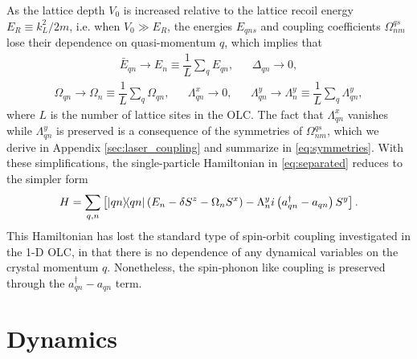 \documentclass[aps,notitlepage,nofootinbib,11pt]{revtex4-1}
\newcommand{\f}[2]{\dfrac{#1}{#2}} %
\newcommand{\p}[1]{\left(#1\right)} %
\renewcommand{\sp}[1]{\left[#1\right]} %
\newcommand{\1}{\mathds{1}}
\begin{document}
As the lattice depth $V_0$ is increased relative to the lattice recoil
energy $E_R\equiv k_L^2/2m$, i.e. when $V_0\gg E_R$, the energies
$E_{qns}$ and coupling coefficients $\Omega^{qs}_{nm}$ lose their
dependence on quasi-momentum $q$, which implies that
\begin{align}
  \bar E_{qn} \to E_n \equiv \f1L\sum_q E_{qn},
  &&
  \Delta_{qn} \to 0,
\end{align}
\begin{align}
  \Omega_{qn} \to \Omega_n \equiv \f1L\sum_q \Omega_{qn},
  &&
  \Lambda_{qn}^x \to 0,
  &&
  \Lambda_{qn}^y \to
  \Lambda_n^y \equiv \f1L\sum_q \Lambda_{qn}^y,
\end{align}
where $L$ is the number of lattice sites in the OLC. The fact that
$\Lambda_{qn}^x$ vanishes while $\Lambda_{qn}^y$ is preserved is a
consequence of the symmetries of $\Omega^{qs}_{nm}$, which we derive
in Appendix \ref{sec:laser_coupling} and summarize in
\eqref{eq:symmetries}. With these simplifications, the single-particle
Hamiltonian in \eqref{eq:separated} reduces to the simpler form
\begin{align}
  H
  = \sum_{q,n}\sp{\op{qn}\p{E_n - \delta S^z - \Omega_n S^x}
    - \Lambda_n^y i\p{a_{qn}^\dag - a_{qn}}S^y}.
  \label{eq:deep}
\end{align}
This Hamiltonian has lost the standard type of spin-orbit coupling
investigated in the 1-D OLC, in that there is no dependence of any
dynamical variables on the crystal momentum $q$.  Nonetheless, the
spin-phonon like coupling is preserved through the
$a_{qn}^\dag-a_{qn}$ term.


\section{Dynamics}
\label{sec:dynamics}
\end{document}
